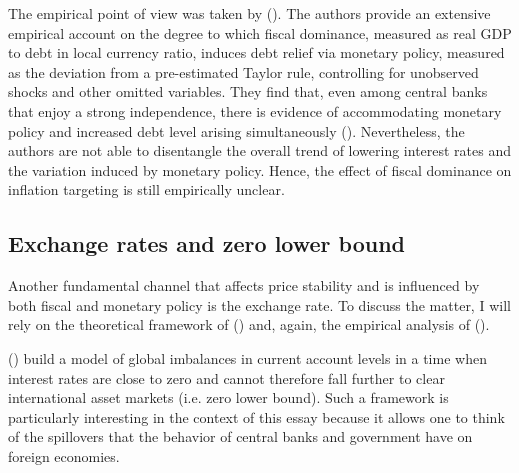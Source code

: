 \documentclass[american]{scrartcl}
\newcommand{\citein}[1]{\citeauthor{#1} (\citeyear{#1})}
\begin{document}
The empirical point of view was taken by \citein{Ahmed2021}. The authors provide an extensive empirical account on the degree to which fiscal dominance, measured as real GDP to debt in local currency ratio, induces debt relief via monetary policy, measured as the deviation from a pre-estimated Taylor rule, controlling for unobserved shocks and other omitted variables. They find that, even among central banks that enjoy a strong independence, there is evidence of accommodating monetary policy and increased debt level arising simultaneously (\cite[p. 19]{Ahmed2021}). Nevertheless, the authors are not able to disentangle the overall trend of lowering interest rates and the variation induced by monetary policy. Hence, the effect of fiscal dominance on inflation targeting is still empirically unclear.

\subsection{Exchange rates and zero lower bound} \label{caballero}

Another fundamental channel that affects price stability and is influenced by both fiscal and monetary policy is the exchange rate. To discuss the matter, I will rely on the theoretical framework of \citein{Caballero2016} and, again, the empirical analysis of \citein{Ahmed2021}.

\citein{Caballero2016} build a model of global imbalances in current account levels in a time when interest rates are close to zero and cannot therefore fall further to clear international asset markets (i.e. zero lower bound). Such a framework is particularly interesting in the context of this essay because it allows one to think of the spillovers that the behavior of central banks and government have on foreign economies.
\end{document}
